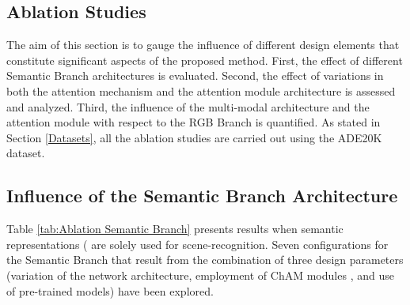 \documentclass[review, 3p, sort&compress]{elsarticle}
\begin{document}
\begin{table}[!t]
\end{table}

\subsection{Ablation Studies}\label{subsec:Ablation Studies}
The aim of this section is to gauge the influence of different design elements that constitute significant aspects of the proposed method. First, the effect of different Semantic Branch architectures is evaluated. Second, the effect of variations in both the attention mechanism and the attention module architecture is assessed and analyzed. Third, the influence of the multi-modal architecture and the attention module with respect to the RGB Branch is quantified. As stated in Section \ref{Datasets}, all the ablation studies are carried out using the ADE20K dataset.

\subsection*{Influence of the Semantic Branch Architecture}
Table \ref{tab:Ablation Semantic Branch} presents results when semantic representations ( are solely used for scene-recognition. Seven configurations for the Semantic Branch that result from the combination of three design parameters (variation of the network architecture, employment of ChAM modules \cite{woo2018cbam}, and use of pre-trained models) have been explored.
\end{document}
